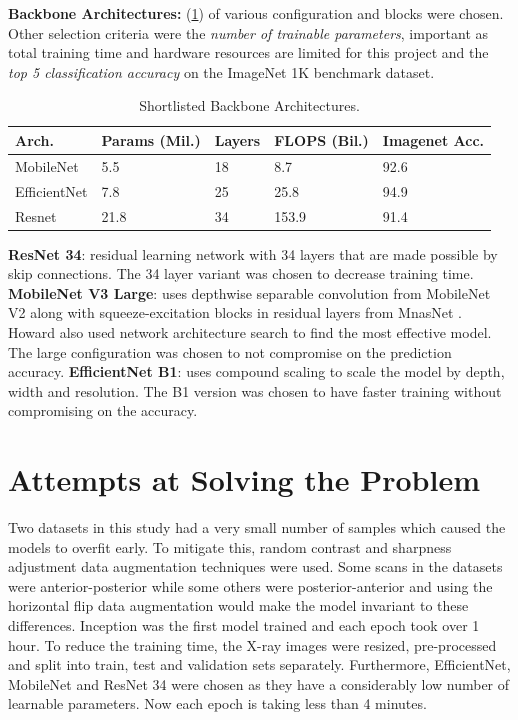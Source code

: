 \documentclass[10pt,twocolumn,letterpaper]{article}
\begin{document}
\textbf{Backbone Architectures:} (\cref{tab:selArch}) of various configuration and blocks were chosen. Other selection criteria were the \textit{number of trainable parameters}, important as total training time and hardware resources are limited for this project and the \textit{top 5 classification accuracy} on the ImageNet 1K benchmark dataset.
\begin{table}
  \centering
  \begin{tabular}{p{1.7cm}|p{1cm}|p{1cm}|p{1cm}|p{1cm}}
  \toprule
  Arch. & Params (Mil.) & Layers & FLOPS (Bil.) & Imagenet Acc.\\
  \midrule
  MobileNet & 5.5 & 18 & 8.7 & 92.6\\
  \midrule
  EfficientNet & 7.8 & 25 & 25.8 & 94.9\\
  \midrule
  Resnet & 21.8 & 34 & 153.9 & 91.4\\
  \bottomrule
  \end{tabular}
  \caption{Shortlisted Backbone Architectures.}
  \vspace{-1.5em}
  \label{tab:selArch}
\end{table}
\textbf{ResNet 34}: residual learning network with 34 layers that are made possible by skip connections. The 34 layer variant was chosen to decrease training time. \cite{he2016deep}
\textbf{MobileNet V3 Large}: uses depthwise separable convolution from MobileNet V2 \cite{sandler2018mobilenetv2} along with squeeze-excitation blocks in residual layers from MnasNet \cite{tan2019mnasnet}. Howard \etal \cite{howard2019searching} also used network architecture search to find the most effective model. The large configuration was chosen to not compromise on the prediction accuracy.
\textbf{EfficientNet B1}: uses compound scaling to scale the model by depth, width and resolution. The B1 version was chosen to have faster training without compromising on the accuracy. \cite{tan2019efficientnet}
\section{Attempts at Solving the Problem} 
\label{sec:method}
Two datasets in this study had a very small number of samples which caused the models to overfit early. To mitigate this, random contrast and sharpness adjustment \cite{nanni2021comparison} data augmentation techniques were used. Some scans in the datasets were anterior-posterior while some others were posterior-anterior and using the horizontal flip data augmentation would make the model invariant to these differences\cite{botev2022regularising}.
Inception was the first model trained and each epoch took over 1 hour. To reduce the training time, the X-ray images were resized, pre-processed and split into train, test and validation sets separately. Furthermore, EfficientNet, MobileNet and ResNet 34 were chosen as they have a considerably low number of learnable parameters. Now each epoch is taking less than 4 minutes. 
\end{document}
